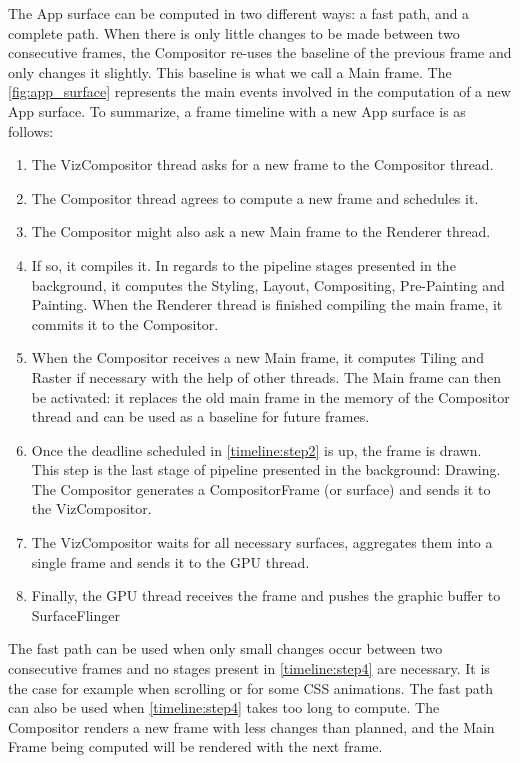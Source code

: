 \documentclass{kththesis}
\begin{document}
The App surface can be computed in two different ways: a fast path, and a complete path. When there is only little changes to be made between two consecutive frames, the Compositor re-uses the baseline of the previous frame and only changes it slightly. This baseline is what we call a Main frame.
The \autoref{fig:app_surface} represents the main events involved in the computation of a new App surface. To summarize, a frame timeline with a new App surface is as follows:
\begin{enumerate}[ref={Step}\xspace\arabic*]
    \item \label{timeline:step1} The VizCompositor thread asks for a new frame to the Compositor thread.
    \item \label{timeline:step2} The Compositor thread agrees to compute a new frame and schedules it.
    \item \label{timeline:step3}The Compositor might also ask a new Main frame to the Renderer thread.
    \item \label{timeline:step4}If so, it compiles it. In regards to the pipeline stages presented in the background, it computes the Styling, Layout, Compositing, Pre-Painting and Painting. When the Renderer thread is finished compiling the main frame, it commits it to the Compositor.
    \item \label{timeline:step5}When the Compositor receives a new Main frame, it computes Tiling and Raster if necessary with the help of other threads. The Main frame can then be activated: it replaces the old main frame in the memory of the Compositor thread and can be used as a baseline for future frames.
    \item \label{timeline:step6} Once the deadline scheduled in \ref{timeline:step2} is up, the frame is drawn. This step is the last stage of pipeline presented in the background: Drawing. The Compositor generates a CompositorFrame (or surface) and sends it to the VizCompositor.
    \item \label{timeline:step7}The VizCompositor waits for all necessary surfaces, aggregates them into a single frame and sends it to the GPU thread.
    \item \label{timeline:step8}Finally, the GPU thread receives the frame and pushes the graphic buffer to SurfaceFlinger
\end{enumerate}

The fast path can be used when only small changes occur between two consecutive frames and no stages present in \ref{timeline:step4} are necessary. It is the case for example when scrolling or for some CSS animations. The fast path can also be used when \ref{timeline:step4} takes too long to compute. The Compositor renders a new frame with less changes than planned, and the Main Frame being computed will be rendered with the next frame.
\end{document}
